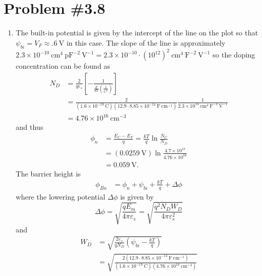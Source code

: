 \documentclass{article}
\begin{document}
\section*{Problem \#3.8}
\begin{enumerate}
  \item{The built-in potential is given by the intercept of the line on the 
        plot so that $\psi_{bi} = V_{F} \approx .6 ~\mathrm{V}$ in this case.
        The slope of the line is approximately 
        $2.3 \times 10^{-10} ~\mathrm{cm}^{4} ~\mathrm{pF}^{-2} ~\mathrm{V}^{-1}
        = 2.3 \times 10^{-10}\cdot (10^{12})^2 ~\mathrm{cm}^4 ~\mathrm{F}^{-2} ~\mathrm{V}^{-1}$ so the doping
        concentration can be found as
        \begin{align*}
        N_D &= \frac{2}{q \varepsilon_s}\left[
               -\frac{1}{\frac{d}{dV}\left(\frac{1}{C^2}\right)}\right] \\
            &= \frac{2}{(1.6 \times 10^{-19} ~\mathrm{C})
                        (12.9 \cdot 8.85 \times 10^{-14} ~\mathrm{F}~\mathrm{cm}^{-1})}
               \frac{1}{2.3 \times 10^{14} ~\mathrm{cm}^4 ~\mathrm{F}^{-2}~\mathrm{V}^{-1}} \\
            &= 4.76 \times 10^{16} ~\mathrm{cm}^{-3} 
       \end{align*}
       and thus
       \begin{align*}
         \phi_{n} &= \frac{E_{C} - E_{F}}{q} = \frac{kT}{q} \ln \frac{N_C}{N_D} \\
                  &= (0.0259 ~\mathrm{V}) \ln \frac{4.7 \times 10^{17}}{4.76 \times 10^{16}} \\
                  &= 0.059 ~\mathrm{V}.
       \end{align*}
       The barrier height is
       \begin{align*}
         \phi_{Bn} &= \phi_n + \psi_{bi} + \frac{kT}{q} + \Delta \phi 
       \end{align*}
       where the lowering potential $\Delta \phi$ is given by
       $$
       \Delta \phi = \sqrt{\frac{q E_m}{4 \pi \varepsilon_s}} 
                   = \sqrt{\frac{q^2 N_D W_D}{4 \pi \varepsilon_s^2}}
       $$
       and
       \begin{align*}
       W_{D} &= \sqrt{\frac{2 \varepsilon_s}{q N_D}\left(\psi_{bi} - \frac{kT}{q}\right)} \\
             &= \sqrt{\frac{2 (12.9 \cdot 8.85 \times 10^{-14} ~\mathrm{F}~\mathrm{cm}^{-1})}
                           {(1.6 \times 10^{-19} ~\mathrm{C})
                            (4.76 \times 10^{16} ~\mathrm{cm}^{-3})}
}
\end{align*}}
\end{enumerate}
\end{document}
